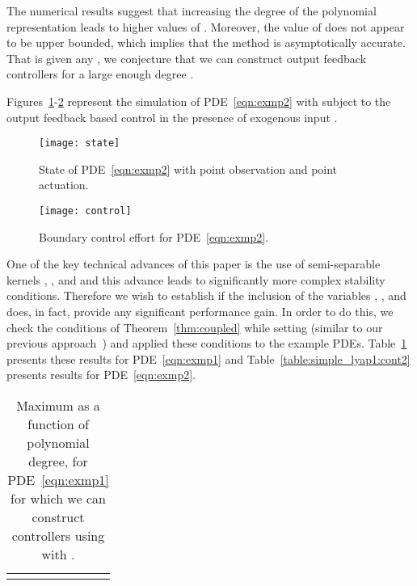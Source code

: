 \documentclass[US letter, 9 pt, conference]{ieeeconf}  \usepackage{setspace}
\begin{document}
The numerical results suggest that increasing the degree  of the polynomial representation leads to higher values of . Moreover, the value of  does not appear to be upper bounded, which implies that the method is asymptotically accurate. That is given any , we conjecture that we can construct output feedback controllers for a large enough degree .

Figures~\ref{fig:1}-\ref{fig:2} represent the simulation of PDE~\eqref{eqn:exmp2} with  subject to the output feedback based control in the presence of exogenous input .
\begin{figure}[h!]
\vspace{-10pt}
    \centering
    \texttt{[image: state]}
    \vspace{-5pt}
\caption{State of PDE~\eqref{eqn:exmp2} with point observation and point actuation.}
\label{fig:1}
\end{figure}
\begin{figure}[h!]
\vspace{-10pt}
    \centering
    \texttt{[image: control]}
    \vspace{-5pt}
\caption{Boundary control effort  for PDE~\eqref{eqn:exmp2}.}
\label{fig:2}
\end{figure}

One of the key technical advances of this paper is the use of semi-separable kernels , ,  and  and this advance leads to significantly more complex stability conditions. Therefore we wish to establish if the inclusion of the variables , ,  and  does, in fact, provide any significant performance gain. In order to do this, we check the conditions of Theorem~\ref{thm:coupled} while setting  (similar to our previous approach~\cite{gahlawat2011designing}) and applied these conditions to the example PDEs.  Table~\ref{table:simple_lyap1:cont1} presents these results for PDE~\eqref{eqn:exmp1} and Table~\ref{table:simple_lyap1:cont2} presents results for PDE~\eqref{eqn:exmp2}.

\begin{table}{}
\caption{Maximum  as a function of polynomial degree,  for PDE~\eqref{eqn:exmp1} for which we can construct controllers using  with .}
\vspace{-10pt}
\begin{center}
    \begin{tabular}{l *{7}{c}}\hline
     &  &  &   \\ \hline
     &  &   & 
\end{tabular}
\end{center}
\label{table:simple_lyap1:cont1}
\end{table}
\end{document}
